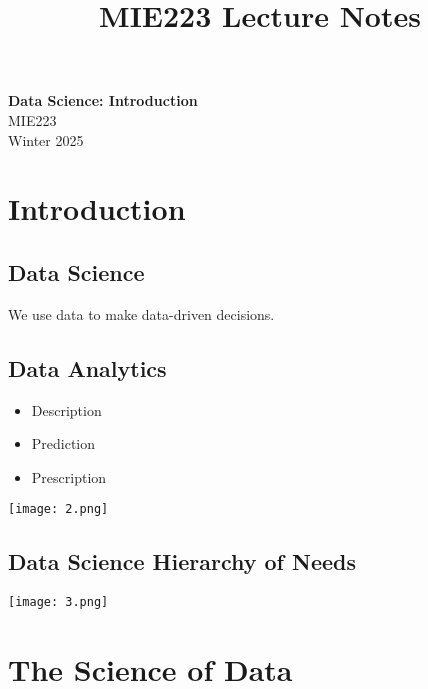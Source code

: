 \documentclass[11pt]{article}
\theoremstyle{definition}
\begin{document}
\setcounter{section}{0}
\title{MIE223 Lecture Notes}

\thispagestyle{empty}

\begin{center}
{\LARGE \bf Data Science: Introduction}\\
{\large MIE223}\\
Winter 2025
\end{center}
\section{Introduction}
\subsection{Data Science}
We use data to make data-driven decisions.
\subsection{Data Analytics}
\begin{itemize}
  \item Description
  \item Prediction
  \item Prescription
\end{itemize}
\texttt{[image: 2.png]}
\subsection{Data Science Hierarchy of Needs}
\texttt{[image: 3.png]}
\newpage
\section{The Science of Data}
\end{document}
